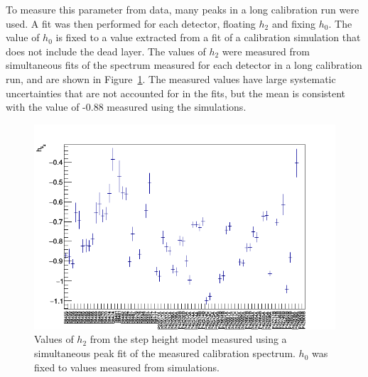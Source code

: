 \documentclass[/main.tex]{subfiles}
\begin{document}
To measure this parameter from data, many peaks in a long calibration run were used.
A fit was then performed for each detector, floating $h_2$ and fixing $h_{0}$.
The value of $h_0$ is fixed to a value extracted from a fit of a calibration simulation that does not include the dead layer.
The values of $h_2$ were measured from simultaneous fits of the spectrum measured for each detector in a long calibration run, and are shown in Figure~\ref{fig:stepheightpars_dat}.
The measured values have large systematic uncertainties that are not accounted for in the fits, but the mean is consistent with the value of -0.88 measured using the simulations.
\begin{figure}[t]
  \centering
  \includegraphics[width=\textwidth]{hs2}
  \caption[Measured values of $h_2$ in calibration data] {\label{fig:stepheightpars_dat}
    Values of $h_2$ from the step height model measured using a simultaneous peak fit of the measured  calibration spectrum. $h_0$ was fixed to values measured from simulations.
  }
\end{figure}
\end{document}

